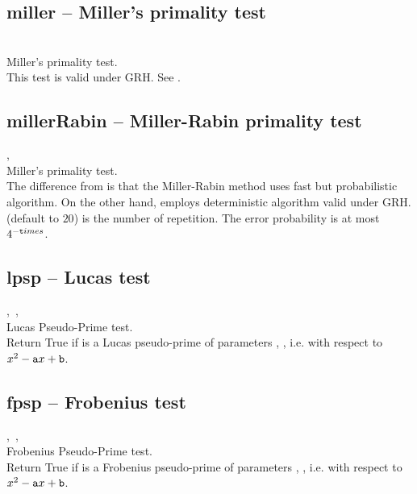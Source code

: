   \subsection{miller -- Miller's primality test}
   {}{}\\
   \spacing
   \quad Miller's primality test.\\
   \spacing
   \quad This test is valid under GRH. See .
   \spacing
%
  \subsection{millerRabin -- Miller-Rabin primality test}
   {,\ }{}\\
   \spacing
   \quad Miller's primality test.\\
   \spacing
   \quad The difference from  is that 
   the Miller-Rabin method uses fast but probabilistic algorithm.
   On the other hand,  employs deterministic
   algorithm valid under GRH.
   \spacing
   \quad {} (default to $20$) is the number of repetition.
   The error probability is at most $4^{-{\texttt times}}$.
%
 \subsection{lpsp -- Lucas test}
   {,\ ,\ }{}\\
   \spacing
   \quad Lucas Pseudo-Prime test.\\
   \spacing
   \quad Return True if  is a Lucas pseudo-prime of parameters , ,
    i.e. with respect to $x^2-{\texttt a}x+{\texttt b}$.
   \spacing
%
 \subsection{fpsp -- Frobenius test}
   {,\ ,\ }{}\\
   \spacing
   \quad Frobenius Pseudo-Prime test.\\
   \spacing
   \quad Return True if  is a Frobenius pseudo-prime of parameters , ,
    i.e. with respect to $x^2-{\texttt a}x+{\texttt b}$.
   \spacing
%
